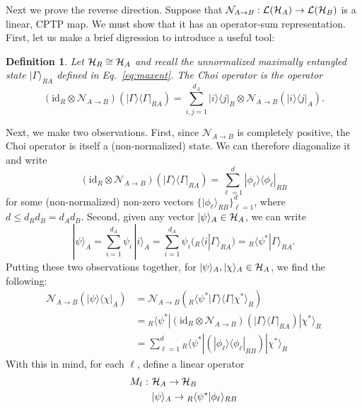 \documentclass[a4paper,11pt]{article}
\newtheorem{defn}[thm]{Definition}
\newcommand{\Eq}[1]{Eq.~\eqref{#1}}
\newcommand{\bra}[1]{\langle #1|}
\newcommand{\ket}[1]{|#1\rangle}
\newcommand{\braket}[2]{\langle #1|#2\rangle}
\newcommand{\ketbra}[2]{| #1 \rangle \langle #2 |}
\newcommand{\Hil}{{\cal H}}
\newcommand{\mrm}[1]{\mathrm{#1}}
\begin{document}
Next we prove the reverse direction.
Suppose that $\mathcal{N}_{A \rightarrow B} : \mathcal{L}(\Hil_A) \rightarrow \mathcal{L}(\Hil_B)$ is a linear, CPTP map.
We must show that it has an operator-sum representation.
First, let us make a brief digression to introduce a useful tool:
\begin{defn} \label{defn:Choi}
Let $\Hil_R \cong \Hil_A$ and recall the unnormalized maximally entangled state $\ket{\Gamma}_{RA}$ defined in \Eq{eq:maxent}.
The \emph{Choi operator} is the operator
\begin{equation}
(\mrm{id}_R \otimes \mathcal{N}_{A \rightarrow B})(\ketbra{\Gamma}{\Gamma}_{RA}) = \sum_{i,j=1}^{d_A} \ketbra{i}{j}_R \otimes \mathcal{N}_{A \rightarrow B}(\ketbra{i}{j}_A).
\end{equation}
\end{defn}
Next, we make two observations.
First, since $\mathcal{N}_{A \rightarrow B}$ is completely positive, the Choi operator is itself a (non-normalized) state.
We can therefore diagonalize it and write
\begin{equation} \label{eq:channel2state}
(\mrm{id}_R \otimes \mathcal{N}_{A \rightarrow B})(\ketbra{\Gamma}{\Gamma}_{RA}) = \sum_{\ell = 1}^d \ketbra{\phi_\ell}{\phi_\ell}_{RB}
\end{equation}
for some (non-normalized) non-zero vectors $\{ \ket{\phi_\ell}_{RB} \}_{\ell = 1}^{d}$, where $d \leq d_R d_B = d_A d_B$.
Second, given any vector $\ket{\psi}_A \in \Hil_A$, we can write
\begin{equation}
\ket{\psi}_A = \sum_{i=1}^{d_A} \psi_i \, \ket{i}_A = \sum_{i=1}^{d_A} \psi_i ({}_R \braket{i}{\Gamma}_{RA} ) = {}_R\braket{\psi^*}{\Gamma}_{RA}.
\end{equation}
Putting these two observations together, for $\ket{\psi}_A, \ket{\chi}_A \in \Hil_A$, we find the following:
\begin{align*}
\mathcal{N}_{A \rightarrow B}(\ketbra{\psi}{\chi}_A) &= \mathcal{N}_{A \rightarrow B} \left( {}_R\braket{\psi^*}{\Gamma} \braket{\Gamma}{\chi^*}_R \right) \\
&= {}_R\bra{\psi^*} (\mrm{id}_R \otimes \mathcal{N}_{A \rightarrow B})(\ketbra{\Gamma}{\Gamma}_{RA}) \ket{\chi^*}_R \\
&= \sum_{\ell = 1}^d {}_R\bra{\psi^*} (\ketbra{\phi_\ell}{\phi_\ell}_{RB} ) \ket{\chi^*}_R
\end{align*}
With this in mind, for each $\ell$, define a linear operator
\begin{equation} \label{eq:Mops}
\begin{aligned}
M_\ell : ~ &\Hil_A \rightarrow \Hil_B \\
&\ket{\psi}_A \rightarrow {}_R\braket{\psi^*}{\phi_\ell}_{RB}
\end{aligned}
\end{equation}
\end{document}
